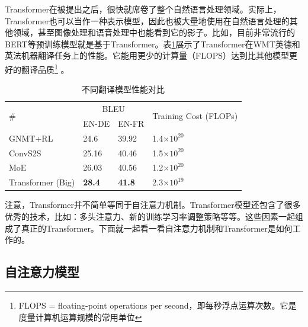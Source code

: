 \parinterval Transformer在被提出之后，很快就席卷了整个自然语言处理领域。实际上，Transformer也可以当作一种表示模型，因此也被大量地使用在自然语言处理的其他领域，甚至图像处理和语音处理中也能看到它的影子。比如，目前非常流行的BERT等预训练模型就是基于Transformer。表\ref{tab:6-12}展示了Transformer在WMT英德和英法机器翻译任务上的性能。它能用更少的计算量（FLOPS）达到比其他模型更好的翻译品质\footnote{FLOPS = floating-point operations per second，即每秒浮点运算次数。它是度量计算机运算规模的常用单位} 。

\begin{table}[htp]
\centering
\caption{ 不同翻译模型性能对比\cite{NIPS2017_7181}}
\label{tab:6-12}
\begin{tabular}{l l l l}
\multicolumn{1}{l|}{\multirow{2}{*}{\#}} & \multicolumn{2}{c}{BLEU} & \multirow{2}{*}{\parbox{6em}{Training Cost (FLOPs)}} \\
\multicolumn{1}{l|}{}                    & EN-DE  & EN-FR  &                                       \\ \hline
\multicolumn{1}{l|}{GNMT+RL}             & 24.6            & 39.92           & 1.4$\times 10^{20}$                   \\
\multicolumn{1}{l|}{ConvS2S}             & 25.16           & 40.46           & 1.5$\times 10^{20}$                   \\
\multicolumn{1}{l|}{MoE}                 & 26.03           & 40.56           & 1.2$\times 10^{20}$                   \\
\multicolumn{1}{l|}{Transformer (Big)}    & {\small\sffamily\bfseries{28.4}}   & {\small\sffamily\bfseries{41.8}}   & 2.3$\times 10^{19}$                   \\
\end{tabular}
\end{table}

\parinterval 注意，Transformer并不简单等同于自注意力机制。Transformer模型还包含了很多优秀的技术，比如：多头注意力、新的训练学习率调整策略等等。这些因素一起组成了真正的Transformer。下面就一起看一看自注意力机制和Transformer是如何工作的。


\subsection{自注意力模型}
\vspace{0.5em}
\label{sec:6.4.1}

